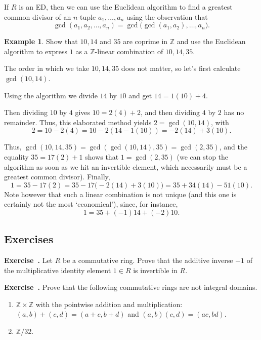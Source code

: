 \documentclass[12pt]{article}
\theoremstyle{definition}
\newtheorem{example}[thm]{Example}
\newcounter{ex}\renewcommand\theex{\arabic{ex}}
\newenvironment{exo}{\begin{flushleft}%
\textbf{\refstepcounter{ex}Exercise~\theex.}}{\end{flushleft}}
\newcommand{\Z}{\ensuremath{\mathbb{Z}}}
\begin{document}
If $R$ is an ED, then we can use the Euclidean algorithm to find a
greatest common divisor of an $n$-tuple $a_1,\dots,a_n$ using the
observation that
$$\gcd(a_1,a_2,\dots,a_n)=\gcd\big(\gcd(a_1,a_2),\dots,a_n\big).$$

\begin{example}
Show that $10,14$ and $35$ are coprime in $\Z$ and use the Euclidean
algorithm to express $1$ as a $\Z$-linear combination of $10,14,35$.

The order in which we take $10,14,35$ does not matter, so let's first
calculate
$\gcd(10,14)$.

Using the algorithm we divide $14$ by $10$ and get
$14=1(10)+4$.

Then dividing $10$ by $4$ gives
$10=2(4)+2$, and then dividing $4$ by $2$ has no remainder. Thus, this
elaborated method yields $2=\gcd(10,14)$, with
$$2=10-2(4)=10-2(14-1(10))=-2(14)+3(10).$$

Thus, $\gcd(10,14,35)=\gcd(\gcd(10,14),35)=\gcd(2,35)$, and
the equality $35=17(2)+1$ shows that $1=\gcd(2,35)$ (we can stop the
algorithm as soon as we hit an invertible element, which necessarily
must be a greatest common divisor).
Finally,
$$1=35-17(2)=35-17\big(-2(14)+3(10)\big)=35+34(14)-51(10).$$
Note however that such a linear combination is not unique (and this
one is certainly not the most `economical'), since, for instance,
$$1=35+(-1)14+(-2)10.$$


\end{example}

\vfill
\newpage

\subsection{Exercises}

\begin{exo}
Let $R$ be a commutative ring. Prove that the additive inverse $-1$ of
the multiplicative identity element $1\in R$ is invertible in $R$.
\end{exo}

\begin{exo}
Prove that the following commutative rings are not integral domains.
\begin{enumerate}
\item $\Z\times\Z$ with the pointwise addition and multiplication:
$(a,b)+(c,d)=(a+c,b+d)$ and $(a,b)(c,d)=(ac,bd)$.
\item $\Z/32$.
\end{enumerate}
\end{exo}
\end{document}
